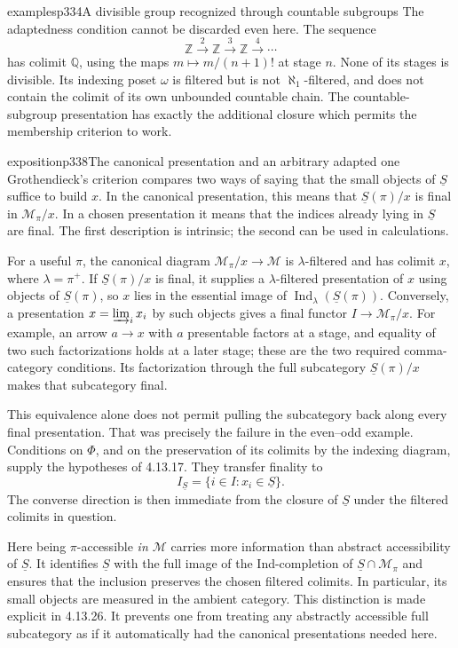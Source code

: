 \begin{dcomment}{examples}{p334}{A divisible group recognized through countable subgroups}
The adaptedness condition cannot be discarded even here. The sequence
\[
 \mathbb Z\xrightarrow{\;2\;}\mathbb Z
 \xrightarrow{\;3\;}\mathbb Z
 \xrightarrow{\;4\;}\cdots
\]
has colimit $\mathbb Q$, using the maps $m\mapsto m/(n+1)!$ at stage $n$. None of its stages is divisible. Its indexing poset $\omega$ is filtered but is not $\aleph_1$-filtered, and does not contain the colimit of its own unbounded countable chain. The countable-subgroup presentation has exactly the additional closure which permits the membership criterion to work.
\end{dcomment}

\begin{dcomment}{exposition}{p338}{The canonical presentation and an arbitrary adapted one}
Grothendieck's criterion compares two ways of saying that the small objects of $\underline S$ suffice to build $x$. In the canonical presentation, this means that $\underline S(\pi)/x$ is final in $\mathcal M_\pi/x$. In a chosen presentation it means that the indices already lying in $\underline S$ are final. The first description is intrinsic; the second can be used in calculations.

For a useful $\pi$, the canonical diagram $\mathcal M_\pi/x\to\mathcal M$ is $\lambda$-filtered and has colimit $x$, where $\lambda=\pi^+$. If $\underline S(\pi)/x$ is final, it supplies a $\lambda$-filtered presentation of $x$ using objects of $\underline S(\pi)$, so $x$ lies in the essential image of $\operatorname{Ind}_\lambda(\underline S(\pi))$. Conversely, a presentation $x=\varinjlim_i x_i$ by such objects gives a final functor $I\to\mathcal M_\pi/x$. For example, an arrow $a\to x$ with $a$ presentable factors at a stage, and equality of two such factorizations holds at a later stage; these are the two required comma-category conditions. Its factorization through the full subcategory $\underline S(\pi)/x$ makes that subcategory final.

This equivalence alone does not permit pulling the subcategory back along every final presentation. That was precisely the failure in the even--odd example. Conditions on $\Phi$, and on the preservation of its colimits by the indexing diagram, supply the hypotheses of 4.13.17. They transfer finality to
\[
 I_{\underline S}
 =\{i\in I:x_i\in\underline S\}.
\]
The converse direction is then immediate from the closure of $\underline S$ under the filtered colimits in question.

Here being $\pi$-accessible \emph{in $\mathcal M$} carries more information than abstract accessibility of $\underline S$. It identifies $\underline S$ with the full image of the Ind-completion of $\underline S\cap\mathcal M_\pi$ and ensures that the inclusion preserves the chosen filtered colimits. In particular, its small objects are measured in the ambient category. This distinction is made explicit in 4.13.26. It prevents one from treating any abstractly accessible full subcategory as if it automatically had the canonical presentations needed here.


\end{dcomment}
